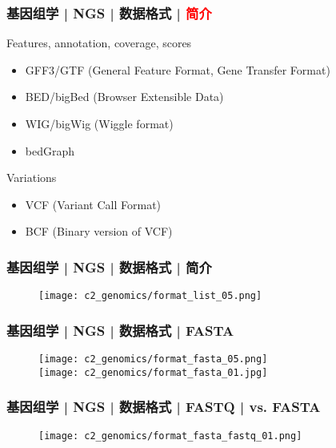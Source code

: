 \begin{frame}
  \frametitle{基因组学 | NGS | 数据格式 | \textcolor{red}{简介}}
  \begin{block}{Features, annotation, coverage, scores}
    \begin{itemize}
      \item GFF3/GTF (General Feature Format, Gene Transfer Format)
      \item BED/bigBed (Browser Extensible Data)
      \item WIG/bigWig (Wiggle format)
      \item bedGraph
    \end{itemize}
  \end{block}
  \pause
  \begin{block}{Variations}
    \begin{itemize}
      \item VCF (Variant Call Format)
      \item BCF (Binary version of VCF)
    \end{itemize}
  \end{block}
\end{frame}

\begin{frame}
  \frametitle{基因组学 | NGS | 数据格式 | 简介}
  \begin{figure}
    \centering
    \texttt{[image: c2\_genomics/format\_list\_05.png]}
  \end{figure}
\end{frame}
    
\begin{frame}
  \frametitle{基因组学 | NGS | 数据格式 | FASTA}
  \begin{figure}
    \centering
    \texttt{[image: c2\_genomics/format\_fasta\_05.png]}\\
    \vspace{1em}
    \texttt{[image: c2\_genomics/format\_fasta\_01.jpg]}
  \end{figure}
\end{frame}
    
\begin{frame}
  \frametitle{基因组学 | NGS | 数据格式 | FASTQ | vs. FASTA}
  \begin{figure}
    \centering
    \texttt{[image: c2\_genomics/format\_fasta\_fastq\_01.png]}
  \end{figure}
\end{frame}

